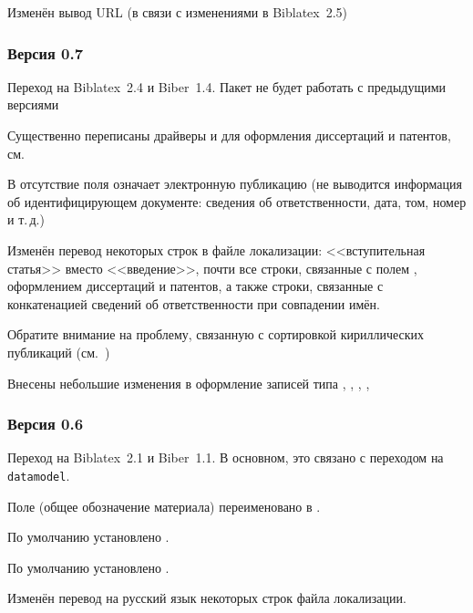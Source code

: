 \documentclass[10pt,a4paper,headings=small,numbers=enddot,english,russian]{ltxdockit}[2011/03/25]
\newcommand*{\biber}{Biber\xspace}
\newcommand*{\biblatex}{Biblatex\xspace}
\begin{document}
\begin{trivlist}
\item Изменён вывод URL (в связи с изменениями в \biblatex~2.5)
\end{trivlist}

\subsubsection*{Версия 0.7}

\begin{trivlist}
\item Переход на \biblatex~2.4 и \biber~1.4. Пакет не будет работать с предыдущими
  версиями
\item Существенно переписаны драйверы  и 
  для оформления диссертаций и патентов, см.~
\item В  отсутствие поля  означает электронную
  публикацию (не выводится информация об идентифицирующем документе:
  сведения об ответственности, дата, том, номер и т.\,д.)
\item Изменён перевод некоторых строк в файле локализации: <<вступительная статья>> вместо
  <<введение>>, почти все строки, связанные с полем ,
  оформлением диссертаций и патентов, а также строки,
  связанные с конкатенацией сведений об ответственности при совпадении имён.
\item Обратите внимание на проблему, связанную с сортировкой кириллических
  публикаций (см.~)
\item Внесены небольшие изменения в оформление записей типа , ,
  , , 
\end{trivlist}

\subsubsection*{Версия 0.6}

\begin{trivlist}
\item Переход на \biblatex~2.1 и \biber~1.1. В основном, это связано с переходом
  на \texttt{datamodel}.
\item Поле  (общее обозначение материала) переименовано в .
\item По умолчанию установлено .
\item По умолчанию установлено .
\item Изменён перевод на русский язык некоторых строк файла локализации.
\end{trivlist}
\end{document}
